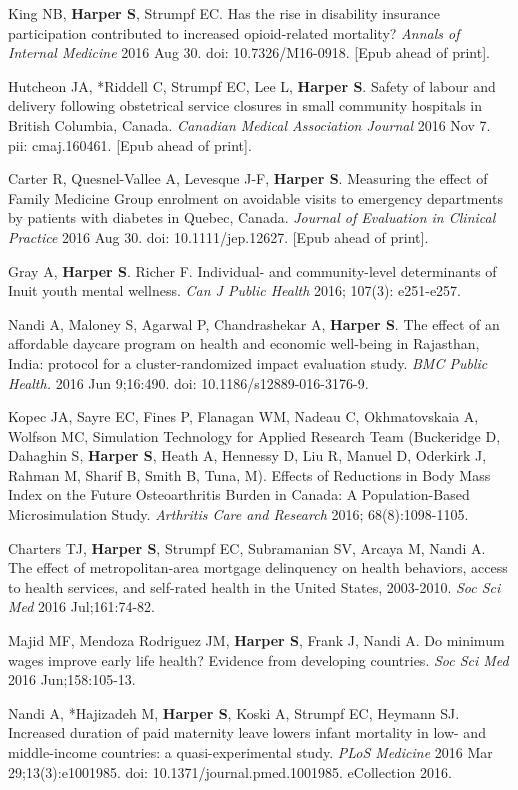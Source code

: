 \documentclass[
  letterpaper,
  DIV=11,
  numbers=noendperiod]{scrartcl}
\begin{document}
King NB, \textbf{Harper S}, Strumpf EC. Has the rise in disability
insurance participation contributed to increased opioid-related
mortality? \emph{Annals of Internal Medicine} 2016 Aug 30. doi:
10.7326/M16-0918. {[}Epub ahead of print{]}.

Hutcheon JA, *Riddell C, Strumpf EC, Lee L, \textbf{Harper S}. Safety of
labour and delivery following obstetrical service closures in small
community hospitals in British Columbia, Canada. \emph{Canadian Medical
Association Journal} 2016 Nov 7. pii: cmaj.160461. {[}Epub ahead of
print{]}.

Carter R, Quesnel-Vallee A, Levesque J-F, \textbf{Harper S}. Measuring
the effect of Family Medicine Group enrolment on avoidable visits to
emergency departments by patients with diabetes in Quebec, Canada.
\emph{Journal of Evaluation in Clinical Practice} 2016 Aug 30. doi:
10.1111/jep.12627. {[}Epub ahead of print{]}.

Gray A, \textbf{Harper S}. Richer F. Individual- and community-level
determinants of Inuit youth mental wellness. \emph{Can J Public Health}
2016; 107(3): e251-e257.

Nandi A, Maloney S, Agarwal P, Chandrashekar A, \textbf{Harper S}. The
effect of an affordable daycare program on health and economic
well-being in Rajasthan, India: protocol for a cluster-randomized impact
evaluation study. \emph{BMC Public Health.} 2016 Jun 9;16:490. doi:
10.1186/s12889-016-3176-9.

Kopec JA, Sayre EC, Fines P, Flanagan WM, Nadeau C, Okhmatovskaia A,
Wolfson MC, Simulation Technology for Applied Research Team (Buckeridge
D, Dahaghin S, \textbf{Harper S}, Heath A, Hennessy D, Liu R, Manuel D,
Oderkirk J, Rahman M, Sharif B, Smith B, Tuna, M). Effects of Reductions
in Body Mass Index on the Future Osteoarthritis Burden in Canada: A
Population-Based Microsimulation Study. \emph{Arthritis Care and
Research} 2016; 68(8):1098-1105.

Charters TJ, \textbf{Harper S}, Strumpf EC, Subramanian SV, Arcaya M,
Nandi A. The effect of metropolitan-area mortgage delinquency on health
behaviors, access to health services, and self-rated health in the
United States, 2003-2010. \emph{Soc Sci Med} 2016 Jul;161:74-82.

Majid MF, Mendoza Rodriguez JM, \textbf{Harper S}, Frank J, Nandi A. Do
minimum wages improve early life health? Evidence from developing
countries. \emph{Soc Sci Med} 2016 Jun;158:105-13.

Nandi A, *Hajizadeh M, \textbf{Harper S}, Koski A, Strumpf EC, Heymann
SJ. Increased duration of paid maternity leave lowers infant mortality
in low- and middle-income countries: a quasi-experimental study.
\emph{PLoS Medicine} 2016 Mar 29;13(3):e1001985. doi:
10.1371/journal.pmed.1001985. eCollection 2016.
\end{document}
